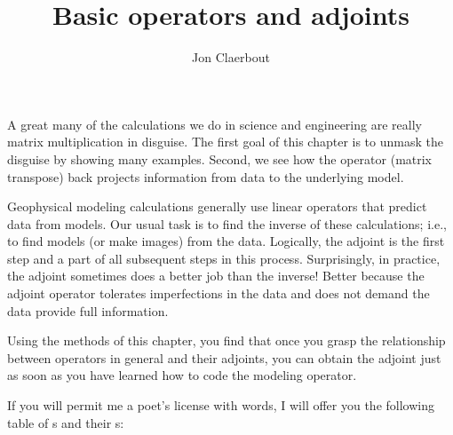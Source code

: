 
\title{Basic operators and adjoints}
\author{Jon Claerbout}
\maketitle

\label{paper:ajt}

A great many of the calculations
we do in science and engineering
are really matrix multiplication in disguise.
The first goal of this chapter is to unmask the disguise
by showing many examples.
Second, we see how the 
 operator (matrix transpose)
back projects information from data to the underlying model.

\par
Geophysical modeling calculations
generally use linear operators that predict data from models.
Our usual task is to find the inverse of these calculations;
i.e., to find models (or make images) from the data.
Logically, the adjoint is the first step
and a part of all subsequent steps in this  process.
Surprisingly, in practice, the adjoint sometimes does a better job
than the inverse!
Better because the adjoint operator tolerates imperfections
in the data and does not demand the data provide full information.

\par
Using the methods of this chapter,
you find that
once you grasp the relationship between operators in general
and their adjoints,
you can obtain the adjoint just
as soon as you have learned how to code
the modeling operator.

\par
If you will permit me a poet's license with words,
I will offer you the following table
of s and their s: 

